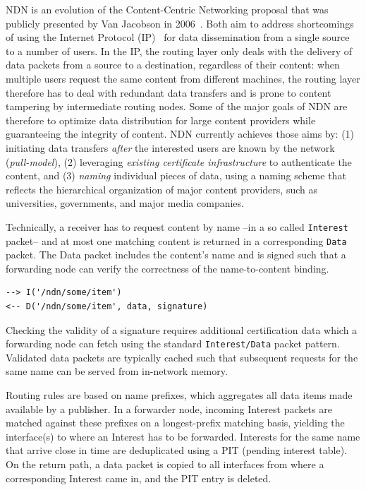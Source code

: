 \documentclass[9pt,sigconf]{acmart}
\begin{document}
NDN is an evolution of the Content-Centric Networking proposal that was publicly presented by Van Jacobson in 2006~\cite{vanJacobson2006ccn}. Both aim to address shortcomings of using the Internet Protocol (IP)~\cite{cerf1974protocol} for data dissemination from a single source to a number of users. In the IP, the routing layer only deals with the delivery of data packets from a source to a destination, regardless of their content: when multiple users request the same content from different machines, the routing layer therefore has to deal with redundant data transfers and is prone to content tampering by intermediate routing nodes. Some of the major goals of NDN are therefore to optimize data distribution for large content providers while guaranteeing the integrity of content. NDN currently achieves those aims by: (1) initiating data transfers \textit{after} the interested users are known by the network (\textit{pull-model}), (2) leveraging \textit{existing certificate infrastructure} to authenticate the content, and (3) \textit{naming} individual pieces of data, using a naming scheme that reflects the hierarchical organization of major content providers, such as universities, governments, and major media companies.

Technically, a receiver has to request content by name --in a so called {\tt Interest} packet-- and
at most one matching content is returned in a corresponding {\tt Data}
packet. The Data packet includes the content's name and is signed such
that a forwarding node can verify the correctness of the
name-to-content binding.

\begin{verbatim}
--> I('/ndn/some/item')
<-- D('/ndn/some/item', data, signature)
\end{verbatim}

Checking the validity of a signature requires
additional certification data which a forwarding node can fetch using
the standard {\tt Interest/Data} packet pattern. Validated data
packets are typically cached such that subsequent requests for the
same name can be served from in-network memory.

Routing rules are based on name prefixes, which aggregates
all data items made available by a publisher. In a forwarder node,
incoming Interest packets are matched against these prefixes on a
longest-prefix matching basis, yielding the interface(s) to where an
Interest has to be forwarded. Interests for the same name that arrive
close in time are deduplicated using a PIT (pending interest
table). On the return path, a data packet is copied to all interfaces
from where a corresponding Interest came in, and the PIT entry is
deleted.
\end{document}

